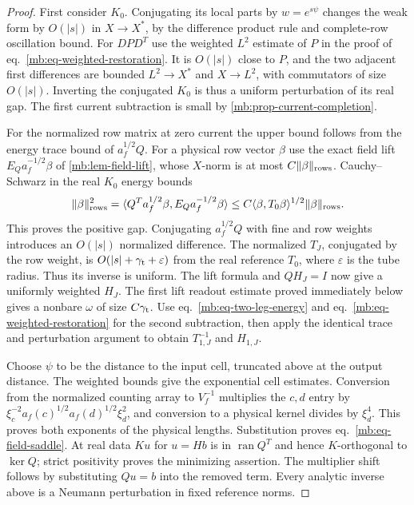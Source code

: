 \documentclass[11pt,letterpaper,reqno]{amsart}
\numberwithin{equation}{section}
\renewcommand{\eqref}[1]{\textup{eq.~\ref{#1}}}
\theoremstyle{definition}
\theoremstyle{remark}
\begin{document}
\begin{proof}
First consider \(K_0\). Conjugating its local parts by \(w=e^{s\psi}\) changes the weak form by \(O(|s|)\) in \(X\to X^*\), by the difference product rule and complete-row oscillation bound. For \(DPD^T\) use the weighted \(L^2\) estimate of \(P\) in the proof of \eqref{mb:eq-weighted-restoration}. It is \(O(|s|)\) close to \(P\), and the two adjacent first differences are bounded \(L^2\to X^*\) and \(X\to L^2\), with commutators of size \(O(|s|)\). Inverting the conjugated \(K_0\) is thus a uniform perturbation of its real gap. The first current subtraction is small by \cref{mb:prop-current-completion}.

For the normalized row matrix at zero current the upper bound follows from the energy trace bound of \(a_f^{1/2}Q\). For a physical row vector \(\beta\) use the exact field lift \(E_Q a_f^{-1/2}\beta\) of \cref{mb:lem-field-lift}, whose \(X\)-norm is at most \(C\|\beta\|_{\rm rows}\). Cauchy--Schwarz in the real \(K_0\) energy bounds
\[
 \|\beta\|_{\rm rows}^2
  =\langle Q^Ta_f^{1/2}\beta,E_Qa_f^{-1/2}\beta\rangle
  \le C\langle\beta,T_0\beta\rangle^{1/2}\|\beta\|_{\rm rows}.
\]
This proves the positive gap. Conjugating \(a_f^{1/2}Q\) with fine and row weights introduces an \(O(|s|)\) normalized difference. The normalized \(T_J\), conjugated by the row weight, is \(O(|s|+\gamma_{\rm t}+\varepsilon)\) from the real reference \(T_0\), where \(\varepsilon\) is the tube radius. Thus its inverse is uniform. The lift formula and \(QH_J=I\) now give a uniformly weighted \(H_J\). The first lift readout estimate proved immediately below gives a nonbare \(\omega\) of size \(C\gamma_{\rm t}\). Use \eqref{mb:eq-two-leg-energy} and \eqref{mb:eq-weighted-restoration} for the second subtraction, then apply the identical trace and perturbation argument to obtain \(T_{1,J}^{-1}\) and \(H_{1,J}\).

Choose \(\psi\) to be the distance to the input cell, truncated above at the output distance. The weighted bounds give the exponential cell estimates. Conversion from the normalized counting array to \(V_f^{-1}\) multiplies the \(c,d\) entry by \(\xi_c^{-2}a_f(c)^{1/2}a_f(d)^{1/2}\xi_d^2\), and conversion to a physical kernel divides by \(\xi_d^4\). This proves both exponents of the physical lengths. Substitution proves \eqref{mb:eq-field-saddle}. At real data \(Ku\) for \(u=Hb\) is in \(\operatorname{ran}Q^T\) and hence \(K\)-orthogonal to \(\ker Q\); strict positivity proves the minimizing assertion. The multiplier shift follows by substituting \(Qu=b\) into the removed term. Every analytic inverse above is a Neumann perturbation in fixed reference norms.
\end{proof}
\end{document}
